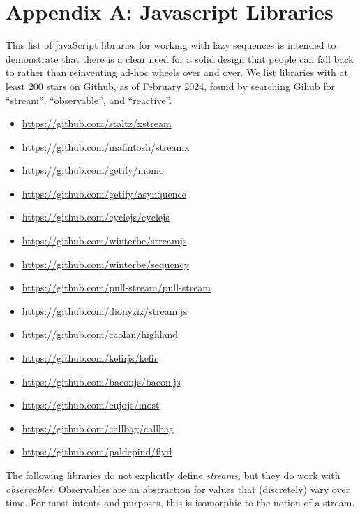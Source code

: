 \documentclass[sigplan,screen,10pt,review]{acmart}
\begin{document}
\section{Appendix A: Javascript Libraries}\label{wtfjs}

This list of javaScript libraries for working with lazy sequences is intended to demonstrate that there is a clear need for a solid design that people can fall back to rather than reinventing ad-hoc wheels over and over. We list libraries with at least 200 stars on Github, as of February 2024, found by searching Gihub for ``stream'', ``observable'', and ``reactive''.

\begin{itemize}
    \item \url{https://github.com/staltz/xstream}
    \item \url{https://github.com/mafintosh/streamx}
    \item \url{https://github.com/getify/monio}
    \item \url{https://github.com/getify/asynquence}
    \item \url{https://github.com/cyclejs/cyclejs}
    \item \url{https://github.com/winterbe/streamjs}
    \item \url{https://github.com/winterbe/sequency}
    \item \url{https://github.com/pull-stream/pull-stream}
    \item \url{https://github.com/dionyziz/stream.js}
    \item \url{https://github.com/caolan/highland}
    \item \url{https://github.com/kefirjs/kefir}
    \item \url{https://github.com/baconjs/bacon.js}
    \item \url{https://github.com/cujojs/most}
    \item \url{https://github.com/callbag/callbag}
    \item \url{https://github.com/paldepind/flyd}
\end{itemize}
    
The following libraries do not explicitly define \textit{streams}, but they do work with \textit{observables}. Observables are an abstraction for values that (discretely) vary over time. For most intents and purposes, this is isomorphic to the notion of a stream.
\end{document}
